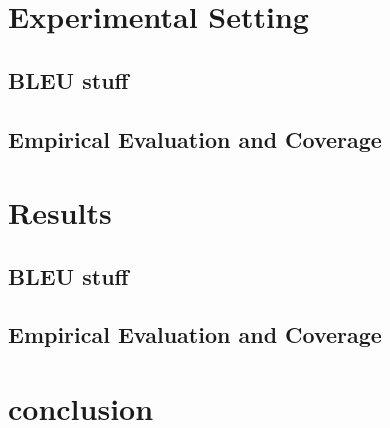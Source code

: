 \documentclass[11pt]{article}
\begin{document}
\section{Experimental Setting}

\subsection{BLEU stuff}

\subsection{Empirical Evaluation and Coverage}
\label{eval}

\section{Results}

\subsection{BLEU stuff}

\subsection{Empirical Evaluation and Coverage}

\section{conclusion}

\end{document}
